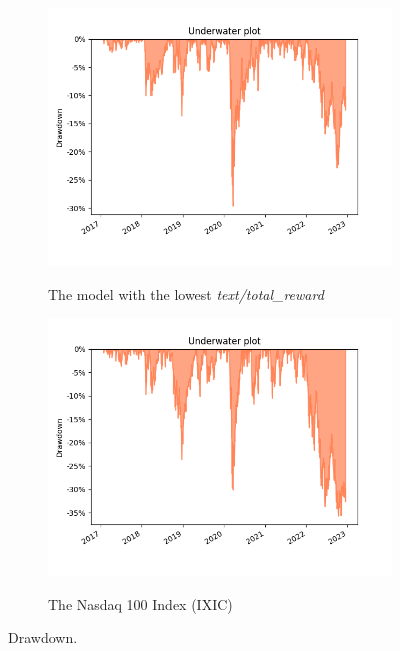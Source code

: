 \documentclass[../xlapes02]{subfiles}
\begin{document}
\begin{figure}
        \vspace{0.5cm}

        \begin{subfigure}[t]{\experimentimgwidth\textwidth}
            \centering
            \includegraphics[width=\linewidth]{image/figure/drawdown_underwater_min}
            \label{fig:drawdown_underwater_min}
            \caption{The model with the lowest \emph{text/total\_reward}}
        \end{subfigure}
        \hfill
        \begin{subfigure}[t]{\experimentimgwidth\textwidth}
            \centering
            \includegraphics[width=\linewidth]{image/figure/drawdown_underwater_ixic}
            \label{fig:drawdown_underwater_ixic}
            \caption{The Nasdaq 100 Index (IXIC)}
        \end{subfigure}

        \caption{Drawdown.}
        \label{fig:drawdown}
    \end{figure}
\end{document}
